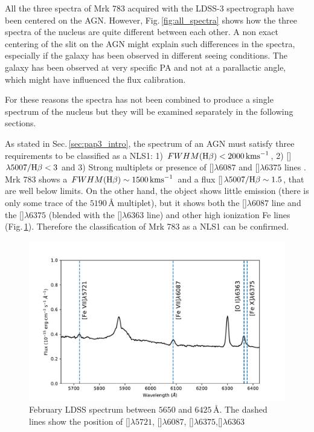 \documentclass[../thesis.tex]{subfiles}
\begin{document}
All the three spectra of Mrk 783 acquired with the LDSS-3 spectrograph have been centered on the AGN.
However, Fig.\,\ref{fig:all_spectra} shows how the three spectra of the nucleus are quite different between each other.
A non exact centering of the slit on the AGN might explain such differences in the spectra, especially if the galaxy has been observed in different seeing conditions.
The galaxy has been observed at very specific PA and not at a parallactic angle, which might have influenced the flux calibration.

For these reasons the spectra has not been combined to produce a single spectrum of the nucleus but they will be examined separately in the following sections.

As stated in Sec.\,\ref{sec:pap3_intro}, the spectrum of an AGN must satisfy three requirements to be classified as a NLS1: 1) $FWHM(\Hb)<2000\,\si{\kms}$, 2) []$\lambda5007/\Hb<3$ \citep{Osterbrock85} and 3) Strong  multiplets or presence of []$\lambda6087$ and []$\lambda6375$ lines \citep{Goodrich89}.
Mrk 783 shows a $FWHM(\Hb)\sim1500\,\si{\kms}$ and a flux []$\lambda5007/\Hb\sim 1.5$, that are well below \citet{Osterbrock85} limits.
On the other hand, the object shows little  emission (there is only some trace of the $5190\,\si{\angstrom}$ multiplet), but it shows both the []$\lambda6087$ line and the []$\lambda6375$ (blended with the []$\lambda6363$ line) and other high ionization Fe lines (Fig.\,\ref{fig:fe_lines}).
Therefore the classification of Mrk 783 as a NLS1 can be confirmed.

\begin{figure}
\centering
\includegraphics[width=\textwidth]{images/paper3/Fe_lines.pdf} 
\caption[]{February LDSS spectrum between $5650$ and $6425\,\si{\angstrom}$. The dashed lines show the position of []$\lambda5721$,  []$\lambda6087$, []$\lambda6375$,[]$\lambda6363$} 
\label{fig:fe_lines}
\end{figure} 
\end{document}
